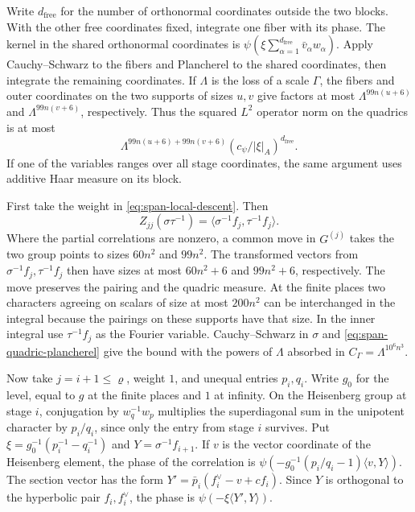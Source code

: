 Write \(d_{\mathrm{free}}\) for the number of orthonormal coordinates
outside the two blocks. With the other free coordinates fixed, integrate
one fiber with its phase. The kernel in the shared orthonormal coordinates
is \(\psi(\xi\sum_{\alpha=1}^{d_{\mathrm{free}}}\bar v_\alpha w_\alpha)\).
Apply Cauchy--Schwarz to the fibers and Plancherel to the shared coordinates,
then integrate the remaining coordinates. If \(\Lambda\) is the loss of
a scale \(\Gamma\), the fibers and outer coordinates on the two supports
of sizes \(u,v\) give factors at most \(\Lambda^{99n(u+6)}\) and
\(\Lambda^{99n(v+6)}\), respectively. Thus the squared \(L^2\) operator
norm on the quadrics is at most
\begin{equation}\label{eq:span-quadric-plancherel}
 \Lambda^{99n(u+6)+99n(v+6)}
              (c_\psi/|\xi|_A)^{d_{\mathrm{free}}}.
\end{equation}
If one of the variables ranges over all stage coordinates, the same
argument uses additive Haar measure on its block.

First take the weight in \eqref{eq:span-local-descent}.
Then
\[
 Z_{jj}(\sigma\tau^{-1})
   =\langle \sigma^{-1}f_j,\tau^{-1}f_j\rangle.
\]
Where the partial correlations are nonzero, a common move in \(G^{(j)}\)
takes the two group points to sizes \(60n^2\) and \(99n^2\). The transformed
vectors from \(\sigma^{-1}f_j,\tau^{-1}f_j\) then have sizes at most
\(60n^2+6\) and \(99n^2+6\), respectively. The move preserves the pairing
and the quadric measure. At the finite places two characters agreeing
on scalars of size at most \(200n^2\) can be interchanged in the integral
because the pairings on these supports have that size. In the inner
integral use \(\tau^{-1}f_j\) as the Fourier variable. Cauchy--Schwarz in
\(\sigma\) and \eqref{eq:span-quadric-plancherel} give the bound with
the powers of \(\Lambda\) absorbed in \(C_\Gamma=\Lambda^{10^6 n^3}\).

Now take \(j=i+1\le\varrho\), weight \(1\), and unequal entries \(p_i,q_i\).
Write \(g_0\) for the level, equal to \(g\) at the finite places and \(1\)
at infinity. On the Heisenberg group at stage \(i\), conjugation by
\(w_q^{-1}w_p\) multiplies the superdiagonal sum in the unipotent character
by \(p_i/q_i\), since only the entry from stage \(i\) survives.
Put \(\xi=g_0^{-1}(p_i^{-1}-q_i^{-1})\) and \(Y=\sigma^{-1}f_{i+1}\).
If \(v\) is the vector coordinate of the Heisenberg element, the phase
of the correlation is \(\psi(-g_0^{-1}(p_i/q_i-1)\langle v,Y\rangle)\).
The section vector has the form \(Y'=\bar p_i(f_i^\vee-v+c f_i)\).
Since \(Y\) is orthogonal to the hyperbolic pair \(f_i,f_i^\vee\), the
phase is \(\psi(-\xi\langle Y',Y\rangle)\).

